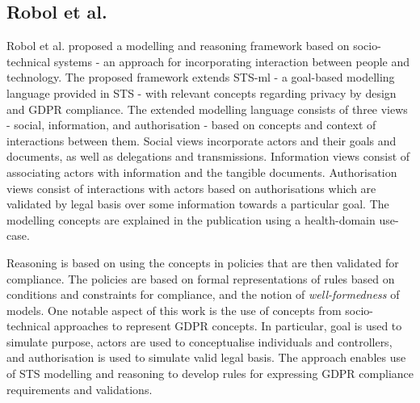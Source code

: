 \subsection{Robol et al.}
Robol et al. \cite{robol_toward_2017} proposed a modelling and reasoning framework based on socio-technical systems \cite{dalpiaz_security_2016} - an approach for incorporating interaction between people and technology. The proposed framework extends STS-ml - a goal-based modelling language provided in STS - with relevant concepts regarding privacy by design and GDPR compliance. The extended modelling language consists of three views - social, information, and authorisation - based on concepts and context of interactions between them. Social views incorporate actors and their goals and documents, as well as delegations and transmissions. Information views consist of associating actors with information and the tangible documents. Authorisation views consist of interactions with actors based on authorisations which are validated by legal basis over some information towards a particular goal. The modelling concepts are explained in the publication using a health-domain use-case.

Reasoning is based on using the concepts in policies that are then validated for compliance. The policies are based on formal representations of rules based on conditions and constraints for compliance, and the notion of \textit{well-formedness} of models. One notable aspect of this work is the use of concepts from socio-technical approaches to represent GDPR concepts. In particular, goal is used to simulate purpose, actors are used to conceptualise individuals and controllers, and authorisation is used to simulate valid legal basis. The approach enables use of STS modelling and reasoning to develop rules for expressing GDPR compliance requirements and validations.

